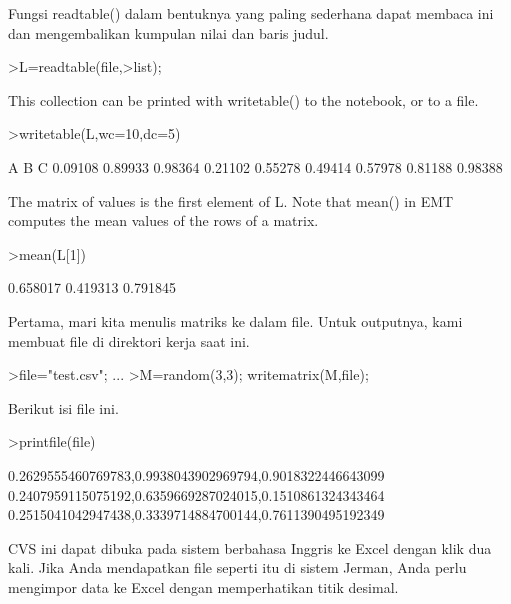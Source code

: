 \documentclass[a4paper,10pt]{article}
\begin{document}
\begin{eulernotebook}
\begin{eulercomment}
\begin{eulercomment}
\begin{euleroutput}
\end{euleroutput}
\begin{eulercomment}
Fungsi readtable() dalam bentuknya yang paling sederhana dapat membaca
ini dan mengembalikan kumpulan nilai dan baris judul.
\end{eulercomment}
\begin{eulerprompt}
>L=readtable(file,>list);
\end{eulerprompt}
\begin{eulercomment}
This collection can be printed with writetable() to the notebook, or to a file.
\end{eulercomment}
\begin{eulerprompt}
>writetable(L,wc=10,dc=5)
\end{eulerprompt}
\begin{euleroutput}
           A         B         C
     0.09108   0.89933   0.98364
     0.21102   0.55278   0.49414
     0.57978   0.81188   0.98388
\end{euleroutput}
\begin{eulercomment}
The matrix of values is the first element of L. Note that mean() in EMT computes the mean
values of the rows of a matrix.
\end{eulercomment}
\begin{eulerprompt}
>mean(L[1])
\end{eulerprompt}
\begin{euleroutput}
       0.658017 
       0.419313 
       0.791845 
\end{euleroutput}
\begin{eulercomment}
Pertama, mari kita menulis matriks ke dalam file. Untuk outputnya,
kami membuat file di direktori kerja saat ini.
\end{eulercomment}
\begin{eulerprompt}
>file="test.csv";  ...
>M=random(3,3); writematrix(M,file);
\end{eulerprompt}
\begin{eulercomment}
Berikut isi file ini.
\end{eulercomment}
\begin{eulerprompt}
>printfile(file)
\end{eulerprompt}
\begin{euleroutput}
  0.2629555460769783,0.9938043902969794,0.9018322446643099
  0.2407959115075192,0.6359669287024015,0.1510861324343464
  0.2515041042947438,0.3339714884700144,0.7611390495192349
  
\end{euleroutput}
\begin{eulercomment}
CVS ini dapat dibuka pada sistem berbahasa Inggris ke Excel dengan
klik dua kali. Jika Anda mendapatkan file seperti itu di sistem
Jerman, Anda perlu mengimpor data ke Excel dengan memperhatikan titik
desimal.


\end{eulercomment}
\end{eulercomment}
\end{eulercomment}
\end{eulernotebook}
\end{document}
